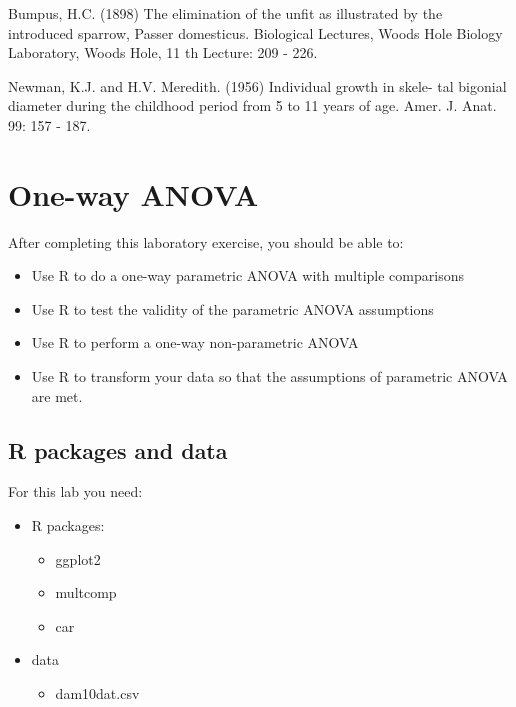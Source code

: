 \documentclass[
  12pt,
]{book}
\providecommand{\tightlist}{%
  \setlength{\itemsep}{0pt}\setlength{\parskip}{0pt}}
\begin{document}
Bumpus, H.C. (1898) The elimination of the unfit as illustrated by the introduced sparrow, Passer domesticus. Biological Lectures, Woods Hole Biology Laboratory, Woods Hole, 11 th Lecture: 209 - 226.

Newman, K.J. and H.V. Meredith. (1956) Individual growth in skele- tal bigonial diameter during the childhood period from 5 to 11 years of age. Amer. J. Anat. 99: 157 - 187.

\hypertarget{one-way-anova}{%
\chapter{One-way ANOVA}\label{one-way-anova}}

After completing this laboratory exercise, you should be able to:

\begin{itemize}
\tightlist
\item
  Use R to do a one-way parametric ANOVA with multiple comparisons
\item
  Use R to test the validity of the parametric ANOVA assumptions
\item
  Use R to perform a one-way non-parametric ANOVA
\item
  Use R to transform your data so that the assumptions of parametric ANOVA are met.
\end{itemize}

\hypertarget{set-ano}{%
\section{R packages and data}\label{set-ano}}

For this lab you need:

\begin{itemize}
\tightlist
\item
  R packages:

  \begin{itemize}
  \tightlist
  \item
    ggplot2
  \item
    multcomp
  \item
    car
  \end{itemize}
\item
  data

  \begin{itemize}
  \tightlist
  \item
    dam10dat.csv
  \end{itemize}
\end{itemize}
\end{document}
